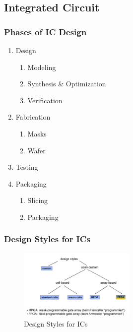 \subsection{Integrated Circuit}
\subsubsection{Phases of IC Design}
\begin{enumerate}
	\item Design
	\begin{enumerate}
		\item Modeling
		\item Synthesis \& Optimization
		\item Verification
	\end{enumerate}
	\item Fabrication
	\begin{enumerate}
		\item Masks
		\item Wafer
	\end{enumerate}
	\item Testing
	\item Packaging
	\begin{enumerate}
		\item Slicing
		\item Packaging
	\end{enumerate}	
\end{enumerate}

\subsubsection{Design Styles for ICs}
\begin{figure}[h]
	\begin{center}
		\includegraphics[width=0.5\textwidth]{images/IC_Design_Styles.png}
		\caption{Design Styles for ICs}
		\label{fig:IC_Sty}
	\end{center}
\end{figure}

